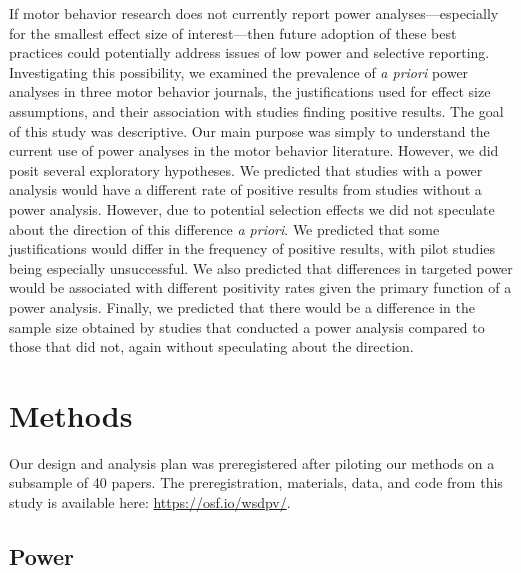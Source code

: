 \documentclass[
  doc, donotrepeattitle,floatsintext]{apa7}
\begin{document}
If motor behavior research does not currently report power analyses---especially for the smallest effect size of interest---then future adoption of these best practices could potentially address issues of low power and selective reporting. Investigating this possibility, we examined the prevalence of \emph{a priori} power analyses in three motor behavior journals, the justifications used for effect size assumptions, and their association with studies finding positive results. The goal of this study was descriptive. Our main purpose was simply to understand the current use of power analyses in the motor behavior literature. However, we did posit several exploratory hypotheses. We predicted that studies with a power analysis would have a different rate of positive results from studies without a power analysis. However, due to potential selection effects we did not speculate about the direction of this difference \emph{a priori}. We predicted that some justifications would differ in the frequency of positive results, with pilot studies being especially unsuccessful. We also predicted that differences in targeted power would be associated with different positivity rates given the primary function of a power analysis. Finally, we predicted that there would be a difference in the sample size obtained by studies that conducted a power analysis compared to those that did not, again without speculating about the direction.

\hypertarget{methods}{%
\section{Methods}\label{methods}}

Our design and analysis plan was preregistered after piloting our methods on a subsample of 40 papers. The preregistration, materials, data, and code from this study is available here: \url{https://osf.io/wsdpv/}.

\hypertarget{power}{%
\subsection{Power}\label{power}}
\end{document}
